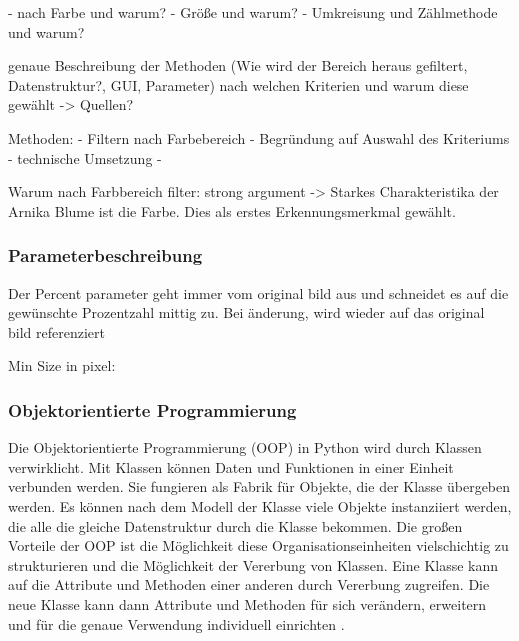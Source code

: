 - nach Farbe und warum? 
- Größe und warum?
- Umkreisung und Zählmethode und warum?

genaue Beschreibung der Methoden (Wie wird der Bereich heraus gefiltert, Datenstruktur?, GUI, Parameter)
nach welchen Kriterien und warum diese gewählt -> Quellen?




Methoden: 
- Filtern nach Farbebereich 
  - Begründung auf Auswahl des Kriteriums
  - technische Umsetzung
  - 


Warum nach Farbbereich filter:
strong argument -> Starkes Charakteristika der Arnika Blume ist die Farbe. Dies als erstes Erkennungsmerkmal gewählt.

\subsubsection{Parameterbeschreibung}
Der Percent parameter geht immer vom original bild aus und schneidet es auf die gewünschte Prozentzahl mittig zu. Bei änderung, wird wieder auf das original bild referenziert

Min Size in pixel: 

\subsubsection{Objektorientierte Programmierung}

Die Objektorientierte Programmierung (OOP) in Python wird durch Klassen verwirklicht. Mit Klassen können Daten und Funktionen in einer Einheit verbunden werden. Sie fungieren als Fabrik für Objekte, die der Klasse übergeben werden. Es können nach dem Modell der Klasse viele Objekte instanziiert werden, die alle die gleiche Datenstruktur durch die Klasse bekommen. Die großen Vorteile der OOP ist die Möglichkeit diese Organisationseinheiten vielschichtig zu strukturieren und die Möglichkeit der Vererbung von Klassen. Eine Klasse kann auf die Attribute und Methoden einer anderen durch Vererbung zugreifen. Die neue Klasse kann dann Attribute und Methoden für sich verändern, erweitern und für die genaue Verwendung individuell einrichten \citep[vgl.][]{Lutz2013}.


